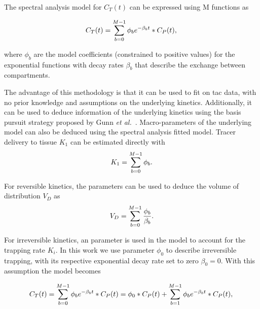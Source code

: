 The spectral analysis model for $C_T(t)$ can be expressed using M functions as

\begin{equation} 
\label{eqn:SpectralModel}
C_{T}(t)  =  \sum_{b=0}^{M-1} {\phi_b}  e^{-\beta_b t} \ast C_P(t)   \\ , \\
\end{equation}

where $\phi_b$ are the model coefficients (constrained to positive values) for the exponential functions with decay rates $\beta_b$ that describe the exchange between compartments. 

The advantage of this methodology is that it can be used to fit on \gls{tac} data, with no prior knowledge and assumptions on the underlying kinetics. Additionally, it can be used to deduce information of the underlying kinetics using the basis pursuit strategy proposed by Gunn \textit{et al.}~\cite{Gunn2002}.
Macro-parameters of the underlying model can also be deduced using the spectral analysis fitted model. Tracer delivery to tissue $K_1$ can be estimated directly with
\begin{equation} 
\label{eqn:SpectralModel_K1}
K_1  =  \sum_{b=0}^{M-1} {\phi_b}   \\ . \\
\end{equation}

For reversible kinetics, the parameters can be used to deduce the volume of distribution $V_D$ as
\begin{equation} 
\label{eqn:SpectralModel_VD}
V_D  =  \sum_{b=0}^{M-1} \frac{\phi_b}{\beta_b}   \\ . \\
\end{equation}

For irreversible kinetics, an parameter is used in the model to account for the trapping rate $K_i$. In this work we use parameter ${\phi_0}$ to describe irreversible trapping, with its respective exponential decay rate set to zero ${\beta_0} = 0 $. With this assumption the model becomes

\begin{equation} 
\label{eqn:SpectralModel_VD}
C_{T}(t)  =  \sum_{b=0}^{M-1} {\phi_b}  e^{-\beta_b t} \ast C_P(t)  =  \phi_0 \ast C_P(t) + \sum_{b=1}^{M-1} {\phi_b}  e^{-\beta_b t} \ast C_P(t)  \\ , \\
\end{equation}

